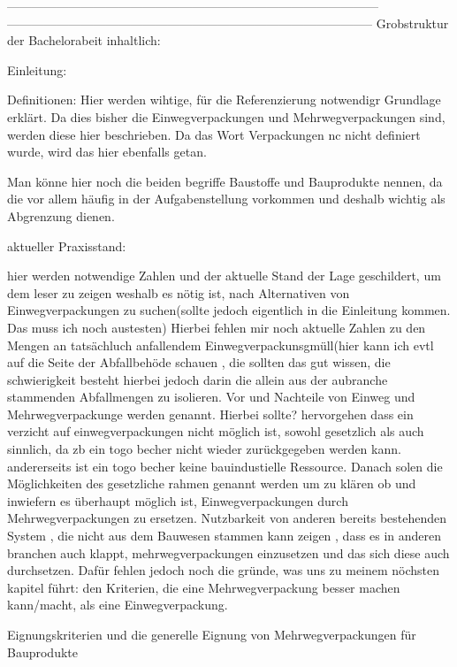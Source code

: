 ------------------------------------------------------------------------------------------
-----------------------------------------------------------------------------------------
Grobstruktur der Bachelorabeit inhaltlich:
        
        Einleitung:
        
            Definitionen: Hier werden wihtige, für die Referenzierung notwendigr Grundlage erklärt. Da dies bisher die Einwegverpackungen und Mehrwegverpackungen sind, werden diese hier beschrieben. Da das Wort Verpackungen nc nicht definiert wurde, wird das hier ebenfalls getan.
        
            Man könne hier noch die beiden begriffe Baustoffe und Bauprodukte nennen, da die vor allem häufig in der Aufgabenstellung vorkommen und deshalb wichtig als Abgrenzung dienen.
        
        aktueller Praxisstand:
            
            hier werden notwendige Zahlen und der aktuelle Stand der Lage geschildert, um dem leser zu zeigen weshalb es nötig ist, nach Alternativen von Einwegverpackungen zu suchen(sollte jedoch eigentlich in die Einleitung kommen. Das muss ich noch austesten) Hierbei fehlen mir noch aktuelle Zahlen zu den Mengen an tatsächluch anfallendem Einwegverpackunsgmüll(hier kann ich evtl auf die Seite der Abfallbehöde schauen , die sollten das gut wissen, die schwierigkeit besteht hierbei jedoch darin die allein aus der aubranche stammenden Abfallmengen zu isolieren.
            Vor und Nachteile von Einweg und Mehrwegverpackunge werden genannt. Hierbei sollte? hervorgehen dass ein verzicht auf einwegverpackungen nicht möglich ist, sowohl gesetzlich als auch sinnlich, da zb ein togo becher nicht wieder zurückgegeben werden kann. andererseits ist ein togo becher keine bauindustielle Ressource.
            Danach solen die Möglichkeiten des gesetzliche rahmen genannt werden um zu klären ob und inwiefern es überhaupt möglich ist, Einwegverpackungen durch Mehrwegverpackungen zu ersetzen.
            Nutzbarkeit von anderen bereits bestehenden System , die nicht aus dem Bauwesen stammen kann zeigen , dass es in anderen branchen auch klappt, mehrwegverpackungen einzusetzen und das sich diese auch durchsetzen. Dafür fehlen jedoch noch die gründe, was uns zu meinem nöchsten kapitel führt: den Kriterien, die eine Mehrwegverpackung besser machen kann/macht, als eine Einwegverpackung.
        
        Eignungskriterien und die generelle Eignung von Mehrwegverpackungen für Bauprodukte
        

